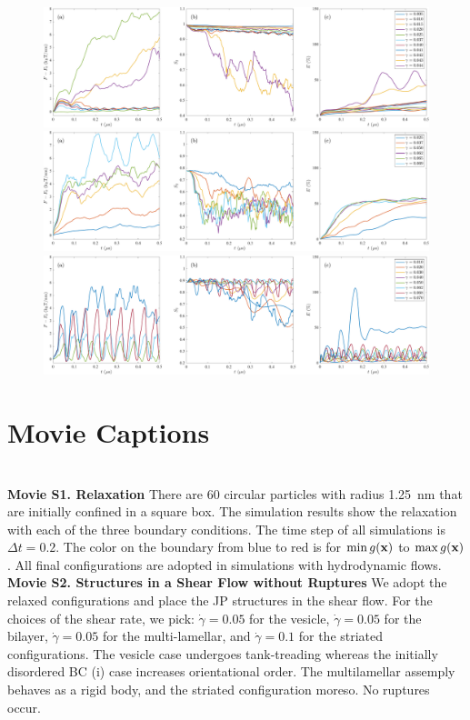 \begin{figure}[t]
\begin{center}
\includegraphics[width=\textwidth]{SMFigures/VeTGRaw.pdf}
\includegraphics[width=\textwidth]{SMFigures/MLTGRaw.pdf}
\includegraphics[width=\textwidth]{SMFigures/StShRaw.pdf}
\end{center}
\caption{}
\end{figure}

\sloppy
\section{Movie Captions}\mbox{} \\

\noindent
{\bf Movie S1. Relaxation} 
There are 60 circular particles with radius 1.25~nm that are initially
confined in a square box. The simulation results show the relaxation
with each of the three boundary conditions. The time step of all
simulations is $\Delta t=0.2$. The color on the boundary from blue to
red is for $\min g(\mathbf{x})$ to $\max g(\mathbf{x})$. All final configurations are
adopted in simulations with hydrodynamic flows. \\


\noindent
{\bf Movie S2. Structures in a Shear Flow without Ruptures} 
We adopt the relaxed configurations and place the JP structures in the
shear flow. For the choices of the shear rate, we pick: $\dot\gamma =
0.05$ for the vesicle, $\dot\gamma = 0.05$ for the bilayer, $\dot\gamma
= 0.05$ for the multi-lamellar, and $\dot\gamma = 0.1$ for the striated
configurations. The vesicle case undergoes tank-treading whereas the
initially disordered BC (i) case increases orientational order. The
multilamellar assemply behaves as a rigid body, and the striated
configuration moreso. No ruptures occur. \\



